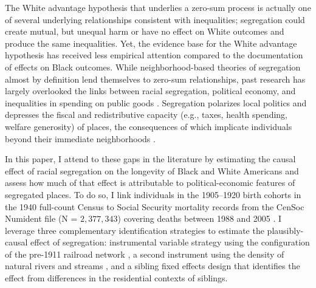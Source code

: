 \documentclass[11pt]{article}
\begin{document}
The White advantage hypothesis that underlies a zero-sum process is actually one of several underlying relationships consistent with inequalities; segregation could create mutual, but unequal harm or have no effect on White outcomes and produce the same inequalities. Yet, the evidence base for the White advantage hypothesis has received less empirical attention compared to the documentation of effects on Black outcomes. While neighborhood-based theories of segregation almost by definition lend themselves to zero-sum relationships, past research has largely overlooked the links between racial segregation, political economy, and inequalities in spending on public goods \citep{trounstine_segregation_2016,manduca_tax_2025}. Segregation polarizes local politics and depresses the fiscal and redistributive capacity (e.g., taxes, health spending, welfare generosity) of places, the consequences of which implicate individuals beyond their immediate neighborhoods \citep{trounstine_segregation_2016,chyn_effects_2026,ananat_segregation_2009}.

In this paper, I attend to these gaps in the literature by estimating the causal effect of racial segregation on the longevity of Black and White Americans and assess how much of that effect is attributable to political-economic features of segregated places. To do so, I link individuals in the 1905--1920 birth cohorts in the 1940 full-count Census to Social Security mortality records from the CenSoc Numident file (N = $2{,}377{,}343$) covering deaths between 1988 and 2005 \citep{ruggles_ipums_2023,breen_censoc_2023}. I leverage three complementary identification strategies to estimate the plausibly-causal effect of segregation: instrumental variable strategy using the configuration of the pre-1911 railroad network \citep{ananat_wrong_2011}, a second instrument using the density of natural rivers and streams \citep{trounstine_segregation_2016}, and a sibling fixed effects design that identifies the effect from differences in the residential contexts of siblings.
\end{document}
